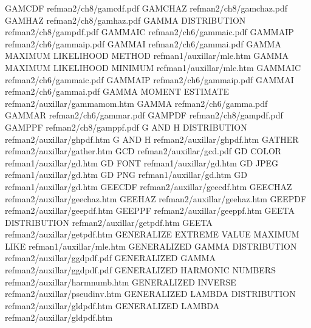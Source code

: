 GAMCDF                                  refman2/ch8/gamcdf.pdf
GAMCHAZ                                 refman2/ch8/gamchaz.pdf
GAMHAZ                                  refman2/ch8/gamhaz.pdf
GAMMA DISTRIBUTION                      refman2/ch8/gampdf.pdf
GAMMAIC                                 refman2/ch6/gammaic.pdf
GAMMAIP                                 refman2/ch6/gammaip.pdf
GAMMAI                                  refman2/ch6/gammai.pdf
GAMMA MAXIMUM LIKELIHOOD METHOD         refman1/auxillar/mle.htm
GAMMA MAXIMUM LIKELIHOOD MINIMUM        refman1/auxillar/mle.htm
GAMMAIC                                 refman2/ch6/gammaic.pdf
GAMMAIP                                 refman2/ch6/gammaip.pdf
GAMMAI                                  refman2/ch6/gammai.pdf
GAMMA MOMENT ESTIMATE                   refman2/auxillar/gammamom.htm
GAMMA                                   refman2/ch6/gamma.pdf
GAMMAR                                  refman2/ch6/gammar.pdf
GAMPDF                                  refman2/ch8/gampdf.pdf
GAMPPF                                  refman2/ch8/gamppf.pdf
G AND H DISTRIBUTION                    refman2/auxillar/ghpdf.htm
G AND H                                 refman2/auxillar/ghpdf.htm
GATHER                                  refman2/auxillar/gather.htm
GCD                                     refman2/auxillar/gcd.pdf
GD COLOR                                refman1/auxillar/gd.htm
GD FONT                                 refman1/auxillar/gd.htm
GD JPEG                                 refman1/auxillar/gd.htm
GD PNG                                  refman1/auxillar/gd.htm
GD                                      refman1/auxillar/gd.htm
GEECDF                                  refman2/auxillar/geecdf.htm
GEECHAZ                                 refman2/auxillar/geechaz.htm
GEEHAZ                                  refman2/auxillar/geehaz.htm
GEEPDF                                  refman2/auxillar/geepdf.htm
GEEPPF                                  refman2/auxillar/geeppf.htm
GEETA DISTRIBUTION                      refman2/auxillar/getpdf.htm
GEETA                                   refman2/auxillar/getpdf.htm
GENERALIZE EXTREME VALUE MAXIMUM LIKE   refman1/auxillar/mle.htm
GENERALIZED GAMMA DISTRIBUTION          refman2/auxillar/ggdpdf.pdf
GENERALIZED GAMMA                       refman2/auxillar/ggdpdf.pdf
GENERALIZED HARMONIC NUMBERS            refman2/auxillar/harmnumb.htm
GENERALIZED INVERSE                     refman2/auxillar/pseudinv.htm
GENERALIZED LAMBDA DISTRIBUTION         refman2/auxillar/gldpdf.htm
GENERALIZED LAMBDA                      refman2/auxillar/gldpdf.htm
